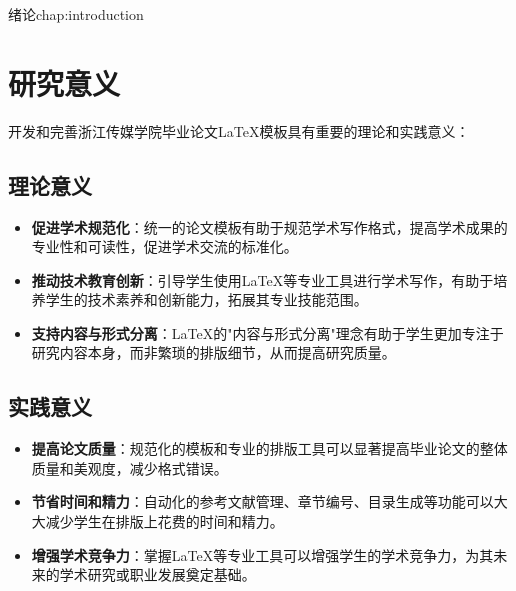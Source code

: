 \begin{cuzchapter}{绪论}{chap:introduction}
	\section{研究意义}\label{sec:significance}

	开发和完善浙江传媒学院毕业论文\LaTeX{}模板具有重要的理论和实践意义：

	\subsection{理论意义}

	\begin{itemize}
		\item \textbf{促进学术规范化}：统一的论文模板有助于规范学术写作格式，提高学术成果的专业性和可读性，促进学术交流的标准化。

		\item \textbf{推动技术教育创新}：引导学生使用\LaTeX{}等专业工具进行学术写作，有助于培养学生的技术素养和创新能力，拓展其专业技能范围。

		\item \textbf{支持内容与形式分离}：\LaTeX{}的"内容与形式分离"理念有助于学生更加专注于研究内容本身，而非繁琐的排版细节，从而提高研究质量。
	\end{itemize}

	\subsection{实践意义}

	\begin{itemize}
		\item \textbf{提高论文质量}：规范化的模板和专业的排版工具可以显著提高毕业论文的整体质量和美观度，减少格式错误。

		\item \textbf{节省时间和精力}：自动化的参考文献管理、章节编号、目录生成等功能可以大大减少学生在排版上花费的时间和精力。

		\item \textbf{增强学术竞争力}：掌握\LaTeX{}等专业工具可以增强学生的学术竞争力，为其未来的学术研究或职业发展奠定基础。


\end{itemize}
\end{cuzchapter}

